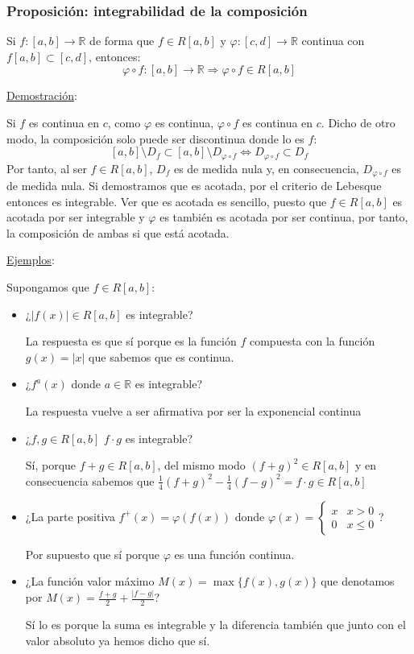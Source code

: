 \documentclass[10pt,a4paper,openright]{book}
\begin{document}
\subsubsection*{Proposición: integrabilidad de la composición}
Si $f: [a,b]\rightarrow \mathbb R$ de forma que $f\in R[a,b]$ y $\varphi: [c,d]\rightarrow \mathbb R$ continua con $f[a,b]\subset[c,d]$, entonces:
$$\varphi \circ f: [a,b]\rightarrow \mathbb R\Rightarrow \varphi\circ f \in R[a,b]$$

\underline{Demostración}:

Si $f$ es continua en $c$, como $\varphi$ es continua, $\varphi\circ f$ es continua en $c$. Dicho de otro modo, la composición solo puede ser discontinua donde lo es $f$:
$$[a,b]\setminus D_f \subset [a,b]\setminus D_{\varphi \circ f} \Leftrightarrow D_{\varphi \circ f} \subset D_f$$
Por tanto, al ser $f\in R[a,b]$, $D_f$ es de medida nula y, en consecuencia, $D_{\varphi\circ f}$ es de medida nula. Si demostramos que es acotada, por el criterio de Lebesque entonces es integrable. Ver que es acotada es sencillo, puesto que $f\in R[a,b]$ es acotada  por ser integrable y $\varphi$ es también es acotada por ser continua, por tanto, la composición de ambas si que está acotada.

\underline{Ejemplos}:

Supongamos que $f\in R[a,b]$:
\begin{itemize}
\item ¿$|f(x)|\in R[a,b]$ es integrable?

La respuesta es que sí porque es la función $f$ compuesta con la función $g(x)=|x|$ que sabemos que es continua.

\item ¿$f^a(x)$ donde $a\in \mathbb R$ es integrable?

La respuesta vuelve a ser afirmativa por ser la exponencial continua

\item ¿$f,g\in R[a,b]$ $f\cdot g$ es integrable?

Sí, porque $f+g\in R[a,b]$, del mismo modo $(f+g)^2\in R[a,b]$ y en consecuencia sabemos que $\frac{1}{4}(f+g)^2-\frac{1}{4}(f-g)^2 = f\cdot g\in R[a,b]$

\item ¿La parte positiva $f^+(x)=\varphi(f(x))$ donde $\varphi(x)=\begin{cases} x & x>0 \\ 0 & x\leq 0\end{cases}$?

Por supuesto que sí porque $\varphi$ es una función continua.

\item ¿La función valor máximo $M(x)=\max\{f(x),g(x)\}$ que denotamos por $M(x)=\frac{f+g}{2}+\frac{|f-g|}{2}$?

Sí lo es porque la suma es integrable y la diferencia también que junto con el valor absoluto ya hemos dicho que sí.
\end{itemize}
\end{document}
